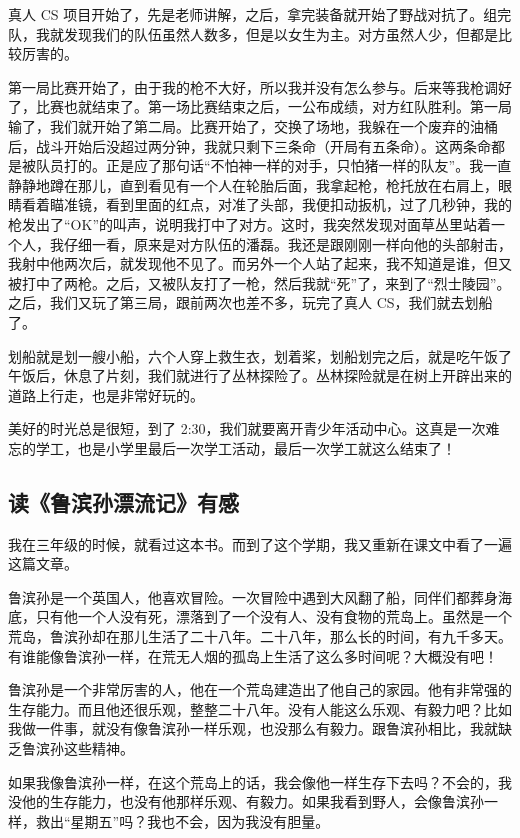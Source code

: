 \documentclass[UTF8,a4paper,titlepage,twoside,10.5pt]{article}
\begin{document}
真人 CS 项目开始了，先是老师讲解，之后，拿完装备就开始了野战对抗了。组完队，我就发现我们的队伍虽然人数多，但是以女生为主。对方虽然人少，但都是比较厉害的。

第一局比赛开始了，由于我的枪不大好，所以我并没有怎么参与。后来等我枪调好了，比赛也就结束了。第一场比赛结束之后，一公布成绩，对方红队胜利。第一局输了，我们就开始了第二局。比赛开始了，交换了场地，我躲在一个废弃的油桶后，战斗开始后没超过两分钟，我就只剩下三条命（开局有五条命）。这两条命都是被队员打的。正是应了那句话“不怕神一样的对手，只怕猪一样的队友”。我一直静静地蹲在那儿，直到看见有一个人在轮胎后面，我拿起枪，枪托放在右肩上，眼睛看着瞄准镜，看到里面的红点，对准了头部，我便扣动扳机，过了几秒钟，我的枪发出了“OK”的叫声，说明我打中了对方。这时，我突然发现对面草丛里站着一个人，我仔细一看，原来是对方队伍的潘磊。我还是跟刚刚一样向他的头部射击，我射中他两次后，就发现他不见了。而另外一个人站了起来，我不知道是谁，但又被打中了两枪。之后，又被队友打了一枪，然后我就“死”了，来到了“烈士陵园”。之后，我们又玩了第三局，跟前两次也差不多，玩完了真人 CS，我们就去划船了。

划船就是划一艘小船，六个人穿上救生衣，划着桨，划船划完之后，就是吃午饭了午饭后，休息了片刻，我们就进行了丛林探险了。丛林探险就是在树上开辟出来的道路上行走，也是非常好玩的。

美好的时光总是很短，到了 2:30，我们就要离开青少年活动中心。这真是一次难忘的学工，也是小学里最后一次学工活动，最后一次学工就这么结束了！

\subsection{读《鲁滨孙漂流记》有感}
\label{sec:org2b6ab7d}

我在三年级的时候，就看过这本书。而到了这个学期，我又重新在课文中看了一遍这篇文章。

鲁滨孙是一个英国人，他喜欢冒险。一次冒险中遇到大风翻了船，同伴们都葬身海底，只有他一个人没有死，漂落到了一个没有人、没有食物的荒岛上。虽然是一个荒岛，鲁滨孙却在那儿生活了二十八年。二十八年，那么长的时间，有九千多天。有谁能像鲁滨孙一样，在荒无人烟的孤岛上生活了这么多时间呢？大概没有吧！

鲁滨孙是一个非常厉害的人，他在一个荒岛建造出了他自己的家园。他有非常强的生存能力。而且他还很乐观，整整二十八年。没有人能这么乐观、有毅力吧？比如我做一件事，就没有像鲁滨孙一样乐观，也没那么有毅力。跟鲁滨孙相比，我就缺乏鲁滨孙这些精神。

如果我像鲁滨孙一样，在这个荒岛上的话，我会像他一样生存下去吗？不会的，我没他的生存能力，也没有他那样乐观、有毅力。如果我看到野人，会像鲁滨孙一样，救出“星期五”吗？我也不会，因为我没有胆量。
\end{document}
